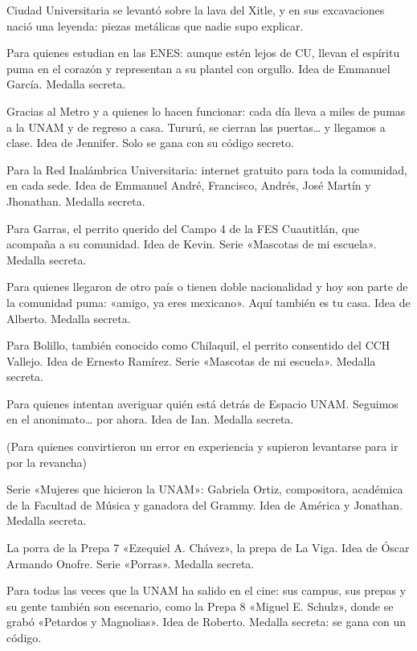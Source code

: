 \begin{description}[leftmargin=1.4cm, style=nextline]
  \item[XITL3UF0] Ciudad Universitaria se levantó sobre la lava del Xitle, y en sus excavaciones nació una leyenda: piezas metálicas que nadie supo explicar.
  \item[3N3S1AN0S] Para quienes estudian en las ENES: aunque estén lejos de CU, llevan el espíritu puma en el corazón y representan a su plantel con orgullo. Idea de Emmanuel García. Medalla secreta.
  \item[TURURU3] Gracias al Metro y a quienes lo hacen funcionar: cada día lleva a miles de pumas a la UNAM y de regreso a casa. Tururú, se cierran las puertas… y llegamos a clase. Idea de Jennifer. Solo se gana con su código secreto.
  \item[R3DR1U] Para la Red Inalámbrica Universitaria: internet gratuito para toda la comunidad, en cada sede. Idea de Emmanuel André, Francisco, Andrés, José Martín y Jhonathan. Medalla secreta.
  \item[G4RR4S0] Para Garras, el perrito querido del Campo 4 de la FES Cuautitlán, que acompaña a su comunidad. Idea de Kevin. Serie «Mascotas de mi escuela». Medalla secreta.
  \item[4M1G0YEM] Para quienes llegaron de otro país o tienen doble nacionalidad y hoy son parte de la comunidad puma: «amigo, ya eres mexicano». Aquí también es tu casa. Idea de Alberto. Medalla secreta.
  \item[CH1LA9U1L] Para Bolillo, también conocido como Chilaquil, el perrito consentido del CCH Vallejo. Idea de Ernesto Ramírez. Serie «Mascotas de mi escuela». Medalla secreta.
  \item[QU13N3R3S] Para quienes intentan averiguar quién está detrás de Espacio UNAM. Seguimos en el anonimato… por ahora. Idea de Ian. Medalla secreta.
  \item[N1N0NP] (Para quienes convirtieron un error en experiencia y supieron levantarse para ir por la revancha)
  \item[G4B0RT1Z] Serie «Mujeres que hicieron la UNAM»: Gabriela Ortiz, compositora, académica de la Facultad de Música y ganadora del Grammy. Idea de América y Jonathan. Medalla secreta.
  \item[L4V1G4] La porra de la Prepa 7 «Ezequiel A. Chávez», la prepa de La Viga. Idea de Óscar Armando Onofre. Serie «Porras». Medalla secreta.
  \item[P0RT4DA] Para todas las veces que la UNAM ha salido en el cine: sus campus, sus prepas y su gente también son escenario, como la Prepa 8 «Miguel E. Schulz», donde se grabó «Petardos y Magnolias». Idea de Roberto. Medalla secreta: se gana con un código.

\end{description}

